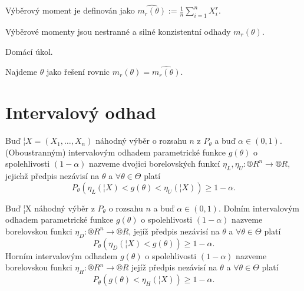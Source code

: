 \documentclass[12pt]{article}					%
\begin{document}
\begin{definice}
	Výběrový moment je definován jako $\widehat{m_r(\theta)} := \frac{1}{n} \sum_{i=1}^n X_i^r$.
\end{definice}

\begin{tvrzeni}[Platí]
	Výběrové momenty jsou nestranné a silné konzistentní odhady $m_r(\theta)$.

	\begin{dukazin}
		Domácí úkol.
	\end{dukazin}
\end{tvrzeni}

\begin{definice}
	Najdeme $\hat\theta$ jako řešení rovnic $m_r(\theta) = \widehat{m_r(\theta)}$.
\end{definice}




\section{Intervalový odhad}
\begin{definice}
	Buď $¦X = (X_1, …, X_n)$ náhodný výběr o rozsahu $n$ z $P_\theta$ a buď $\alpha \in (0, 1)$. (Oboustranným) intervalovým odhadem parametrické funkce $g(\theta)$ o spolehlivosti $(1 - \alpha)$ nazveme dvojici borelovských funkcí $\eta_L, \eta_U: ®R^n \rightarrow ®R$, jejichž předpis nezávisí na $\theta$ a $\forall \theta \in \Theta$ platí
	$$ P_\theta(\eta_L(¦X) < g(\theta) < \eta_U(¦X)) ≥ 1 - \alpha. $$
\end{definice}

\begin{definice}
	Buď ¦X náhodný výběr z $P_\theta$ o rozsahu $n$ a buď $\alpha \in (0, 1)$. Dolním intervalovým odhadem parametrické funkce $g(\theta)$ o spolehlivosti $(1 - \alpha)$ nazveme borelovskou funkci $\eta_D: ®R^n \rightarrow ®R$, jejíž předpis nezávisí na $\theta$ a $\forall \theta \in \Theta$ platí
	$$ P_\theta(\eta_D(¦X) < g(\theta)) ≥ 1 - \alpha. $$
	Horním intervalovým odhadem $g(\theta)$ o spolehlivosti $(1 - \alpha)$ nazveme borelovskou funkci $\eta_H: ®R^n \rightarrow ®R$ jejíž předpis nezávisí na $\theta$ a $\forall \theta \in \Theta$ platí
	$$ P_\theta(g(\theta) < \eta_H(¦X)) ≥ 1 - \alpha. $$
\end{definice}
\end{document}
